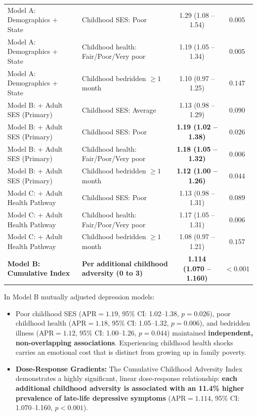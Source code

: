 \begin{table}[!htbp]
{\begin{tabular}{llcc}
Model A: Demographics + State & Childhood SES: Poor & 1.29 (1.08 -- 1.54) & $0.005$ \\
Model A: Demographics + State & Childhood health: Fair/Poor/Very poor & 1.19 (1.05 -- 1.34) & $0.005$ \\
Model A: Demographics + State & Childhood bedridden $\ge 1$ month & 1.10 (0.97 -- 1.25) & $0.147$ \\
\addlinespace
Model B: + Adult SES (Primary) & Childhood SES: Average & 1.13 (0.98 -- 1.29) & $0.090$ \\
Model B: + Adult SES (Primary) & Childhood SES: Poor & \textbf{1.19 (1.02 -- 1.38)} & \textbf{$0.026$} \\
Model B: + Adult SES (Primary) & Childhood health: Fair/Poor/Very poor & \textbf{1.18 (1.05 -- 1.32)} & \textbf{$0.006$} \\
Model B: + Adult SES (Primary) & Childhood bedridden $\ge 1$ month & \textbf{1.12 (1.00 -- 1.26)} & \textbf{$0.044$} \\
\addlinespace
Model C: + Adult Health Pathway & Childhood SES: Poor & 1.13 (0.98 -- 1.31) & $0.089$ \\
Model C: + Adult Health Pathway & Childhood health: Fair/Poor/Very poor & 1.17 (1.05 -- 1.31) & $0.006$ \\
Model C: + Adult Health Pathway & Childhood bedridden $\ge 1$ month & 1.08 (0.97 -- 1.21) & $0.157$ \\
\addlinespace
\textbf{Model B: Cumulative Index} & \textbf{Per additional childhood adversity (0 to 3)} & \textbf{1.114 (1.070 -- 1.160)} & \textbf{$<0.001$} \\
\bottomrule
\end{tabular}%
}
\end{table}

In Model B mutually adjusted depression models:
\begin{itemize}
    \item Poor childhood SES ($\text{APR} = 1.19$, 95\% CI: 1.02--1.38, $p = 0.026$), poor childhood health ($\text{APR} = 1.18$, 95\% CI: 1.05--1.32, $p = 0.006$), and bedridden illness ($\text{APR} = 1.12$, 95\% CI: 1.00--1.26, $p = 0.044$) maintained \textbf{independent, non-overlapping associations}. Experiencing childhood health shocks carries an emotional cost that is distinct from growing up in family poverty.
    \item \textbf{Dose-Response Gradients:} The Cumulative Childhood Adversity Index demonstrates a highly significant, linear dose-response relationship: \textbf{each additional childhood adversity is associated with an 11.4\% higher prevalence of late-life depressive symptoms} ($\text{APR} = 1.114$, 95\% CI: 1.070--1.160, $p < 0.001$).
\end{itemize}

